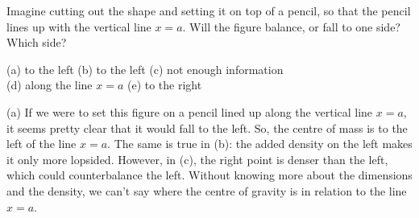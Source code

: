 \begin{hint}
Imagine cutting out the shape and setting it on top of a pencil, so that the pencil lines up with the vertical line $x=a$. Will the figure balance, or fall to one side? Which side?
\end{hint}
\begin{answer}
(a) to the left \qquad (b) to the left \qquad (c) not enough information\\
(d) along the line $x=a$ \qquad (e) to the right
\end{answer}
\begin{solution}
(a) If we were to set this figure on a pencil lined up along the vertical line $x=a$, it seems pretty clear that it would fall to the left. So, the centre of mass is to the left of the line $x=a$. The same is true in (b): the added density on the left makes it only more lopsided. However, in (c), the right point is denser than the left, which could counterbalance the left. Without knowing more about the dimensions and the density, we can't say where the centre of gravity is in relation to the line $x=a$.


\end{solution}

